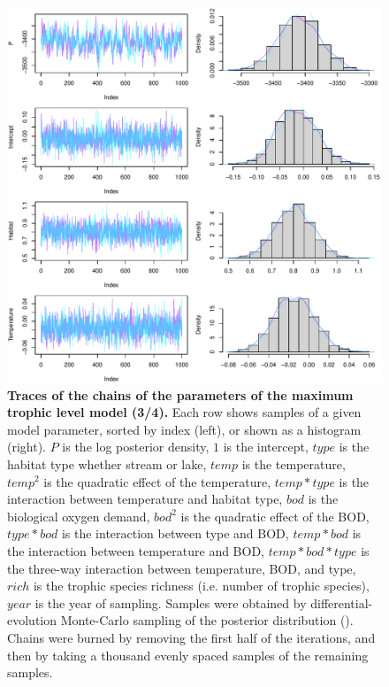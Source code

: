 \documentclass[11pt, oneside]{article}
\begin{document}
\begin{figure}[H]
\begin{center}
\includegraphics[page=3, width=1\linewidth]{b0_6_3/out_mTL/fig_tracePlot_beta.pdf}
\caption{
    \textbf{Traces of the chains of the parameters of the maximum trophic level model (3/4).}
    Each row shows samples of a given model parameter, sorted by index (left), or shown as a histogram (right).
    $P$ is the log posterior density, $1$ is the intercept, $type$ is the habitat type whether stream or lake, $temp$ is the temperature, $temp^2$ is the quadratic effect of the temperature, $temp * type$ is the interaction between temperature and habitat type, $bod$ is the biological oxygen demand, $bod^2$ is the quadratic effect of the BOD, $type * bod$ is the interaction between type and BOD, $temp * bod$ is the interaction between temperature and BOD, $temp * bod * type$ is the three-way interaction between temperature, BOD, and type, $rich$ is the trophic species richness (i.e. number of trophic species), $year$ is the year of sampling.
    Samples were obtained by differential-evolution Monte-Carlo sampling of the posterior distribution (\cite{TerBraak2006}).
    Chains were burned by removing the first half of the iterations, and then by taking a thousand evenly spaced samples of the remaining samples.
}
\end{center}
\end{figure}
\end{document}
